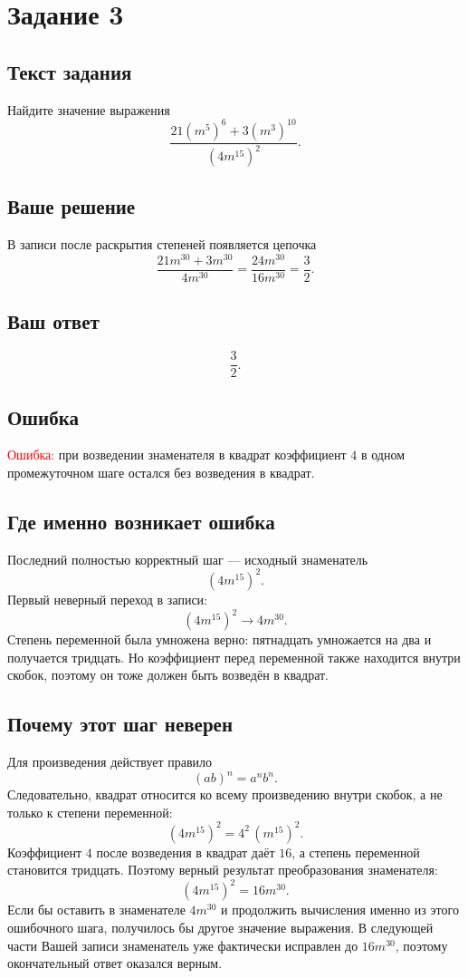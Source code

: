 \documentclass[12pt,a4paper]{article}
\begin{document}
\newpage
{}\label{task:3}
\section*{Задание 3}

\subsection*{Текст задания}
Найдите значение выражения
\[
\frac{21(m^5)^6+3(m^3)^{10}}{(4m^{15})^2}.
\]

\subsection*{Ваше решение}
В записи после раскрытия степеней появляется цепочка
\[
\frac{21m^{30}+3m^{30}}{4m^{30}}
=
\frac{24m^{30}}{16m^{30}}
=
\frac{3}{2}.
\]

\subsection*{Ваш ответ}
\[
\frac{3}{2}.
\]

\subsection*{Ошибка}
\textcolor{red}{Ошибка:} при возведении знаменателя в квадрат коэффициент $4$ в одном промежуточном шаге остался без возведения в квадрат.

\subsection*{Где именно возникает ошибка}
Последний полностью корректный шаг --- исходный знаменатель
\[
(4m^{15})^2.
\]
Первый неверный переход в записи:
\[
(4m^{15})^2 \longrightarrow 4m^{30}.
\]
Степень переменной была умножена верно: пятнадцать умножается на два и получается тридцать. Но коэффициент перед переменной также находится внутри скобок, поэтому он тоже должен быть возведён в квадрат.

\subsection*{Почему этот шаг неверен}
Для произведения действует правило
\[
(ab)^n=a^n b^n.
\]
Следовательно, квадрат относится ко всему произведению внутри скобок, а не только к степени переменной:
\[
(4m^{15})^2=4^2\,(m^{15})^2.
\]
Коэффициент $4$ после возведения в квадрат даёт $16$, а степень переменной становится тридцать. Поэтому верный результат преобразования знаменателя:
\[
(4m^{15})^2=16m^{30}.
\]
Если бы оставить в знаменателе $4m^{30}$ и продолжить вычисления именно из этого ошибочного шага, получилось бы другое значение выражения. В следующей части Вашей записи знаменатель уже фактически исправлен до $16m^{30}$, поэтому окончательный ответ оказался верным.
\end{document}

